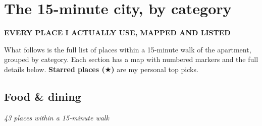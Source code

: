 \documentclass[11pt,a4paper]{article}
\newcommand{\eyebrow}[1]{{\sansheading\bfseries\footnotesize\color{brandred}\MakeUppercase{#1}\par\vspace{0.2em}}}
\begin{document}
\clearpage

\section{The 15-minute city, by category}\label{sec:places}

\eyebrow{Every place I actually use, mapped and listed}

What follows is the full list of places within a 15-minute walk of the apartment, grouped by category. Each section has a map with numbered markers and the full details below. \textbf{Starred places ($\bigstar$)} are my personal top picks.


\subsection{Food \& dining}

\noindent\textit{43 places within a 15-minute walk}
\end{document}
